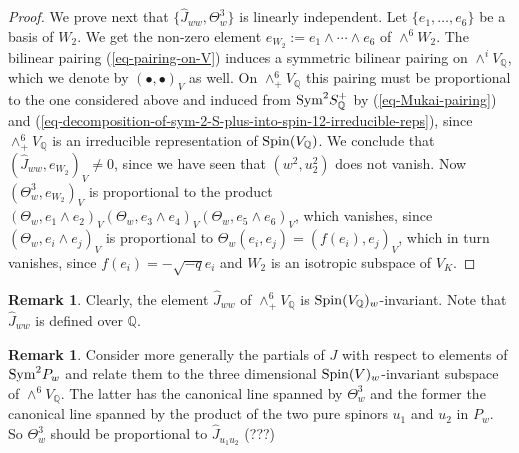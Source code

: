 \documentclass[12pt]{amsart}
\numberwithin{equation}{subsection}
\theoremstyle{plain}
\theoremstyle{definition}
\newtheorem{rem}[thm]{Remark}
\newcommand{\QQ}{{\mathbb Q}}
\newcommand{\Spin}{{\rm Spin}}
\newcommand{\Sym}{{\rm Sym}}
\begin{document}
{\begin{proof}
We prove next that $\{\hat{J}_{ww},\Theta_w^3\}$ is linearly independent.
Let $\{e_1, \dots, e_6\}$ be a basis of $W_2$. We get the non-zero element  $e_{W_2}:=e_1\wedge \cdots \wedge e_6$ of $\wedge^6W_2$.
The bilinear pairing (\ref{eq-pairing-on-V}) induces a symmetric bilinear pairing on $\wedge^iV_\QQ$,
which we denote by $(\bullet,\bullet)_V$ as well.
On $\wedge^6_+V_\QQ$ this pairing must be proportional to the one considered above and induced from $\Sym^2S^+_\QQ$ by 
(\ref{eq-Mukai-pairing}) and (\ref{eq-decomposition-of-sym-2-S-plus-into-spin-12-irreducible-reps}), since $\wedge^6_+V_\QQ$ is an irreducible representation of $\Spin(V_\QQ)$. 
We conclude that $(\hat{J}_{ww},e_{W_2})_V\neq 0$, since we  have seen that $(w^2,u_2^2)$ does not vanish.
Now $(\Theta_w^3,e_{W_2})_V$ is proportional to the product
$(\Theta_w,e_1\wedge e_2)_V(\Theta_w,e_3\wedge e_4)_V(\Theta_w,e_5\wedge e_6)_V$, which vanishes, since 
$(\Theta_w,e_i\wedge e_j)_V$ is proportional to $\Theta_w(e_i,e_j)=(f(e_i),e_j)_V$, which in turn vanishes, since 
$f(e_i)=-\sqrt{-q}e_i$ and $W_2$ is an isotropic subspace of $V_K$.
\end{proof}

\begin{rem}
Clearly, the element $\hat{J}_{ww}$ of $\wedge^6_+V_\QQ$ is $\Spin(V_\QQ)_w$-invariant.
Note that $\hat{J}_{ww}$ is defined over $\QQ$.  
\end{rem}

\begin{rem}
Consider more generally the partials of $J$ with respect to elements of $\Sym^2P_w$ and relate them to the three dimensional $\Spin(V)_w$-invariant subspace of $\wedge^6V_\QQ$. The latter has the canonical line spanned by $\Theta_w^3$ and the former the canonical line spanned by the product of the two pure spinors $u_1$ and $u_2$ in $P_w$. So $\Theta_w^3$ should be proportional to $\hat{J}_{u_1u_2}$ (???)
\end{rem}

}
\end{document}
